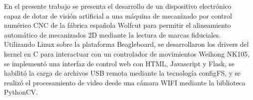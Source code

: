 En el presente trabajo se presenta el desarrollo de un dispositivo electrónico capaz de dotar de visión artificial a una máquina de mecanizado por control numérico CNC de la fábrica española Wolfcut para permitir el alineamiento automático de mecanizados 2D mediante la lectura de marcas fiduciales.
Utilizando Linux sobre la plataforma Beagleboard, se desarrollaron los drivers del kernel en C para interactuar con un controlador de movimientos Weihong NK105, se implementó una interfaz de control web con HTML, Javascript y Flask, se habilitó la carga de archivos USB remota mediante la tecnología configFS, y se realizó el procesamiento de video desde una cámara WIFI mediante la biblioteca PythonCV.
